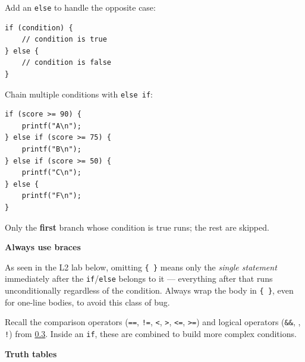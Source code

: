 \documentclass[11pt,a4paper]{article}
\begin{document}
Add an \texttt{else} to handle the opposite case:

\begin{lstlisting}[style=cscode]
if (condition) {
    // condition is true
} else {
    // condition is false
}
\end{lstlisting}

Chain multiple conditions with \texttt{else\ if}:

\begin{lstlisting}[style=cscode]
if (score >= 90) {
    printf("A\n");
} else if (score >= 75) {
    printf("B\n");
} else if (score >= 50) {
    printf("C\n");
} else {
    printf("F\n");
}
\end{lstlisting}

Only the \textbf{first} branch whose condition is true runs; the rest are skipped.

\textbf{Always use braces}

As seen in the L2 lab below, omitting \texttt{\{\ \}} means only the \emph{single statement} immediately after the \texttt{if}/\texttt{else} belongs to it --- everything after that runs unconditionally regardless of the condition. Always wrap the body in \texttt{\{\ \}}, even for one-line bodies, to avoid this class of bug.

\label{122-comparison-and-logical-operators}
\hypertarget{122-comparison-and-logical-operators}{}

Recall the comparison operators (\texttt{==}, \texttt{!=}, \texttt{\textless{}}, \texttt{\textgreater{}}, \texttt{\textless{}=}, \texttt{\textgreater{}=}) and logical operators (\texttt{\&\&}, \texttt{\textbar{}\textbar{}}, \texttt{!}) from \protect\hyperlink{03-arithmetic-and-assignment-operators}{0.3}. Inside an \texttt{if}, these are combined to build more complex conditions.

\textbf{Truth tables}
\end{document}
